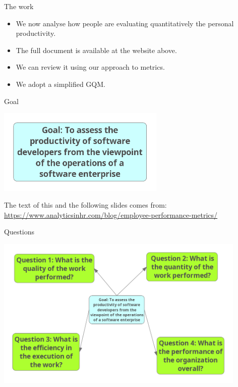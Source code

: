 \documentclass{beamer}
\begin{document}
\begin{frame}{\centerline{The work}}


\begin{itemize}
\item We now analyse how people are evaluating quantitatively the personal productivity. \\
\item The full document is available at the website above. \\
\item We can review it using our approach to metrics. \\
\item We adopt a simplified GQM. \\
\end{itemize}
\end{frame}
\begin{frame}{\centerline{Goal}}

\begin{center}
\includegraphics[width=80mm]{A2022.ScaleDeiDati/20180904_CaseStudy_Goal.png}
\newline
\end{center}
{\tiny The text of this and the following slides comes from:
\url{https://www.analyticsinhr.com/blog/employee-performance-metrics/}
}

\end{frame}

\begin{frame}{\centerline{Questions}}

\begin{center}
\includegraphics[width=120mm]{A2022.ScaleDeiDati/20180904_CaseStudy_GoalQuestions.png}
\newline
\end{center}

\end{frame}
\end{document}
